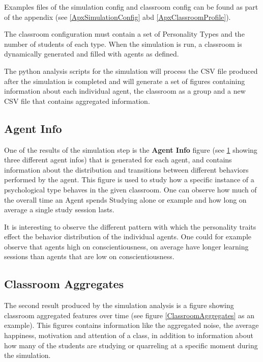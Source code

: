 Examples files of the simulation config and classroom config can be found as part of
the appendix (see \ref{ApxSimulationConfig} abd \ref{ApxClassroomProfile}).

The classroom configuration must contain a set of Personality Types and the number
of students of each type. When the simulation is run, a classroom is dynamically
generated and filled with agents as defined.

The python analysis scripts for the simulation will process the CSV file produced
after the simulation is completed and will generate a set of figures containing information
about each individual agent, the classroom as a group and a new CSV file that contains
aggregated information.

\subsection{Agent Info}
One of the results of the simulation step is the \textbf{Agent Info} figure (see \ref{AgentInfo} showing
three different agent infos) that is generated for each agent, and contains information
about the distribution and transitions between different behaviors performed by the agent.
This figure is used to study how a specific instance of a psychological type behaves
in the given classroom. One can observe how much of the overall time an Agent
spends Studying alone or example and how long on average a single study session lasts.

\bb

It is interesting to observe the different pattern with which the personality traits
effect the behavior distribution of the individual agents. One could for example
observe that agents high on conscientiousness, on average have longer
learning sessions than agents that are low on conscientiousness.

\begin{figure}[H]
    \label{AgentInfo}
    \hspace*{-2.0\leftmargin}
\end{figure}

\subsection{Classroom Aggregates}
The second result produced by the simulation analysis is a figure showing classroom
aggregated features over time (see figure \ref{ClassroomAggregates} as an example).
This figures contains information like the aggregated noise, the average happiness,
motivation and attention of a class, in addition to information about how many of
the students are studying or quarreling at a specific moment during the simulation.

